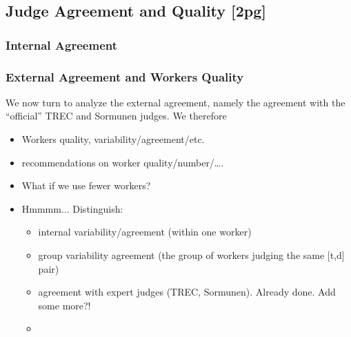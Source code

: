 \subsection{Judge Agreement and Quality [2pg]}

\subsubsection{Internal Agreement}
\label{sec:internal-agreement}

\subsubsection{External Agreement and Workers Quality}
\label{sec:external-agreement}

We now turn to analyze the external agreement, namely the agreement
with the ``official'' TREC and Sormunen judges. We therefore 



\begin{itemize}
\item Workers quality, variability/agreement/etc.
\item  recommendations on worker quality/number/….
\item What if we use fewer workers?
\item Hmmmm... Distinguish:
  \begin{itemize}
  \item internal variability/agreement (within one worker)
  \item group variability agreement (the group of workers judging the same [t,d] pair)
  \item agreement with expert judges (TREC, Sormunen). Already done.
    Add some more?!
  \item {}
  \end{itemize}

\end{itemize}

